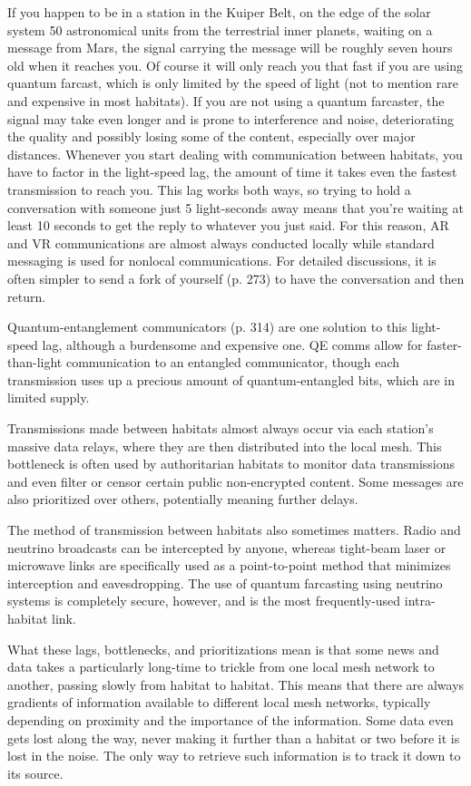 If you happen to be in a station in the Kuiper Belt, 
on the edge of the solar system 50 astronomical units 
from the terrestrial inner planets, waiting on a message
from Mars, the signal carrying the message will
be roughly seven hours old when it reaches you. Of 
course it will only reach you that fast if you are using 
quantum farcast, which is only limited by the speed 
of light (not to mention rare and expensive in most 
habitats). If you are not using a quantum farcaster, 
the signal may take even longer and is prone to interference
and noise, deteriorating the quality and
possibly losing some of the content, especially over 
major distances. Whenever you start dealing with 
communication between habitats, you have to factor 
in the light-speed lag, the amount of time it takes 
even the fastest transmission to reach you. This lag 
works both ways, so trying to hold a conversation 
with someone just 5 light-seconds away means that 
you're waiting at least 10 seconds to get the reply 
to whatever you just said. For this reason, AR and 
VR communications are almost always conducted locally
while standard messaging is used for nonlocal
communications. For detailed discussions, it is often 
simpler to send a fork of yourself (p. 273) to have the 
conversation and then return.

Quantum-entanglement communicators (p. 314) 
are one solution to this light-speed lag, although a 
burdensome and expensive one. QE comms allow 
for faster-than-light communication to an entangled 
communicator, though each transmission uses up a 
precious amount of quantum-entangled bits, which 
are in limited supply.

Transmissions made between habitats almost 
always occur via each station's massive data relays, 
where they are then distributed into the local mesh. 
This bottleneck is often used by authoritarian habitats 
to monitor data transmissions and even filter or censor 
certain public non-encrypted content. Some messages 
are also prioritized over others, potentially meaning 
further delays.

The method of transmission between habitats also 
sometimes matters. Radio and neutrino broadcasts 
can be intercepted by anyone, whereas tight-beam 
laser or microwave links are specifically used as a 
point-to-point method that minimizes interception 
and eavesdropping. The use of quantum farcasting 
using neutrino systems is completely secure, however, 
and is the most frequently-used intra-habitat link.

What these lags, bottlenecks, and prioritizations 
mean is that some news and data takes a particularly 
long-time to trickle from one local mesh network to 
another, passing slowly from habitat to habitat. This 
means that there are always gradients of information 
available to different local mesh networks, typically 
depending on proximity and the importance of the 
information. Some data even gets lost along the way, 
never making it further than a habitat or two before 
it is lost in the noise. The only way to retrieve such 
information is to track it down to its source.

